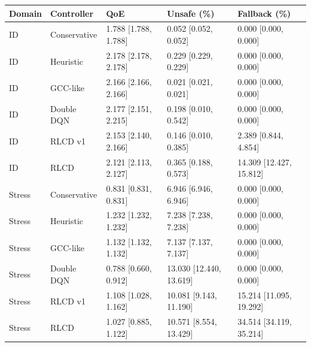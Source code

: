 \begin{tabular}{lllll}
\toprule
Domain & Controller & QoE & Unsafe (\%) & Fallback (\%) \\
\midrule
ID & Conservative & 1.788 [1.788, 1.788] & 0.052 [0.052, 0.052] & 0.000 [0.000, 0.000] \\
ID & Heuristic & 2.178 [2.178, 2.178] & 0.229 [0.229, 0.229] & 0.000 [0.000, 0.000] \\
ID & GCC-like & 2.166 [2.166, 2.166] & 0.021 [0.021, 0.021] & 0.000 [0.000, 0.000] \\
ID & Double DQN & 2.177 [2.151, 2.215] & 0.198 [0.010, 0.542] & 0.000 [0.000, 0.000] \\
ID & RLCD v1 & 2.153 [2.140, 2.166] & 0.146 [0.010, 0.385] & 2.389 [0.844, 4.854] \\
ID & RLCD & 2.121 [2.113, 2.127] & 0.365 [0.188, 0.573] & 14.309 [12.427, 15.812] \\
Stress & Conservative & 0.831 [0.831, 0.831] & 6.946 [6.946, 6.946] & 0.000 [0.000, 0.000] \\
Stress & Heuristic & 1.232 [1.232, 1.232] & 7.238 [7.238, 7.238] & 0.000 [0.000, 0.000] \\
Stress & GCC-like & 1.132 [1.132, 1.132] & 7.137 [7.137, 7.137] & 0.000 [0.000, 0.000] \\
Stress & Double DQN & 0.788 [0.660, 0.912] & 13.030 [12.440, 13.619] & 0.000 [0.000, 0.000] \\
Stress & RLCD v1 & 1.108 [1.028, 1.162] & 10.081 [9.143, 11.190] & 15.214 [11.095, 19.292] \\
Stress & RLCD & 1.027 [0.885, 1.122] & 10.571 [8.554, 13.429] & 34.514 [34.119, 35.214] \\
\bottomrule
\end{tabular}
